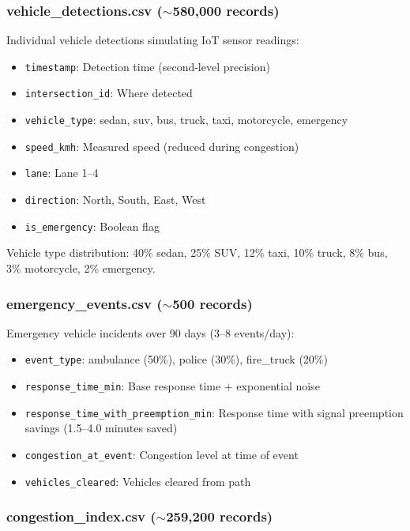 \documentclass[12pt, a4paper]{article}
\begin{document}
\subsubsection{vehicle\_detections.csv ($\sim$580,000 records)}

Individual vehicle detections simulating IoT sensor readings:
\begin{itemize}[nosep]
    \item \texttt{timestamp}: Detection time (second-level precision)
    \item \texttt{intersection\_id}: Where detected
    \item \texttt{vehicle\_type}: sedan, suv, bus, truck, taxi, motorcycle, emergency
    \item \texttt{speed\_kmh}: Measured speed (reduced during congestion)
    \item \texttt{lane}: Lane 1--4
    \item \texttt{direction}: North, South, East, West
    \item \texttt{is\_emergency}: Boolean flag
\end{itemize}

Vehicle type distribution: 40\% sedan, 25\% SUV, 12\% taxi, 10\% truck, 8\% bus, 3\% motorcycle, 2\% emergency.

\subsubsection{emergency\_events.csv ($\sim$500 records)}

Emergency vehicle incidents over 90 days (3--8 events/day):
\begin{itemize}[nosep]
    \item \texttt{event\_type}: ambulance (50\%), police (30\%), fire\_truck (20\%)
    \item \texttt{response\_time\_min}: Base response time + exponential noise
    \item \texttt{response\_time\_with\_preemption\_min}: Response time with signal preemption savings (1.5--4.0 minutes saved)
    \item \texttt{congestion\_at\_event}: Congestion level at time of event
    \item \texttt{vehicles\_cleared}: Vehicles cleared from path
\end{itemize}

\subsubsection{congestion\_index.csv ($\sim$259,200 records)}
\end{document}
